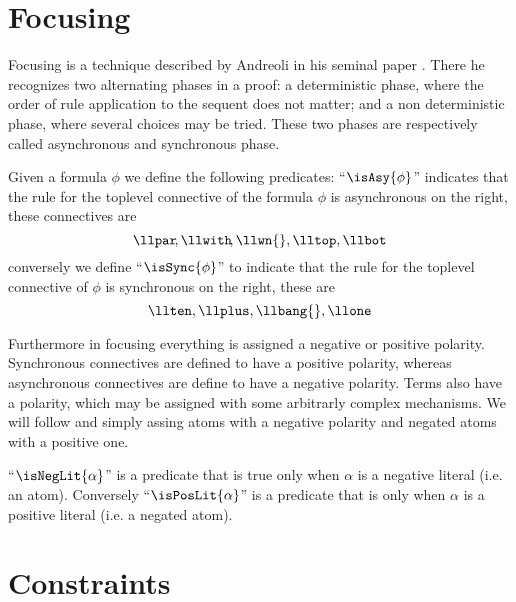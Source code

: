 \section{Focusing}
Focusing is a technique described by Andreoli in his seminal paper \cite{Focusing}.
There he recognizes two alternating phases in a proof: a deterministic phase, where the order of rule application to the sequent does not matter; and a non deterministic phase, where several choices may be tried.
These two phases are respectively called asynchronous and synchronous phase.
\begin{define}
	Given a formula $\phi$ we define the following predicates:
	``$\isAsy{\phi}$'' indicates that the rule for the toplevel connective of the formula $\phi$ is asynchronous on the right, these connectives are 
	$$ \llpar\!, \llwith\!, \llwn{}, \lltop, \llbot $$
	conversely we define ``$\isSync{\phi}$'' to indicate that the rule for the toplevel connective of $\phi$ is synchronous on the right, these are
	$$ \llten, \llplus, \llbang{}, \llone $$
\end{define}
Furthermore in focusing everything is assigned a negative or positive polarity.
Synchronous connectives are defined to have a positive polarity, whereas asynchronous connectives are define to have a negative polarity.
Terms also have a polarity, which may be assigned with some arbitrarly complex mechanisms.
We will follow \cite{LiangMiller} and simply assing atoms with a negative polarity and negated atoms with a positive one.
\begin{define}
	``$\isNegLit{\alpha}$'' is a predicate that is true only when $\alpha$ is a negative literal (i.e. an atom).
	Conversely ``$\isPosLit{\alpha}$'' is a predicate that is only when $\alpha$ is a positive literal (i.e. a negated atom).
\end{define}

\section{Constraints}

